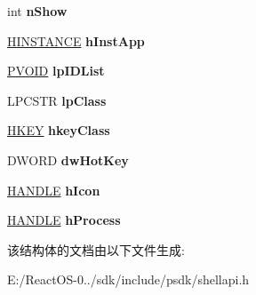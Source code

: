 \begin{DoxyCompactItemize}
\item 
\mbox{\label{struct___s_h_e_l_l_e_x_e_c_u_t_e_i_n_f_o_a_a4584c93c8c4f1a53aa315a49f62ff582}} 
int {\bfseries n\+Show}
\item 
\mbox{\label{struct___s_h_e_l_l_e_x_e_c_u_t_e_i_n_f_o_a_ac3489fd1abdc72976f44166d1aeb1d53}} 
\hyperlink{interfacevoid}{H\+I\+N\+S\+T\+A\+N\+CE} {\bfseries h\+Inst\+App}
\item 
\mbox{\label{struct___s_h_e_l_l_e_x_e_c_u_t_e_i_n_f_o_a_a2f48a7d7e0c1a844d77e313fa35fa6c3}} 
\hyperlink{interfacevoid}{P\+V\+O\+ID} {\bfseries lp\+I\+D\+List}
\item 
\mbox{\label{struct___s_h_e_l_l_e_x_e_c_u_t_e_i_n_f_o_a_a9c24e444699cd4b26fc697a307a43156}} 
L\+P\+C\+S\+TR {\bfseries lp\+Class}
\item 
\mbox{\label{struct___s_h_e_l_l_e_x_e_c_u_t_e_i_n_f_o_a_a7d1bfa5368b63310236b6c4ea32a852f}} 
\hyperlink{interfacevoid}{H\+K\+EY} {\bfseries hkey\+Class}
\item 
\mbox{\label{struct___s_h_e_l_l_e_x_e_c_u_t_e_i_n_f_o_a_a1252bc8cae9469c426a85f468095ecf8}} 
D\+W\+O\+RD {\bfseries dw\+Hot\+Key}
\item 
\mbox{\label{struct___s_h_e_l_l_e_x_e_c_u_t_e_i_n_f_o_a_aa9073cb48fcf3c4f647fbe642a622bee}} 
\hyperlink{interfacevoid}{H\+A\+N\+D\+LE} {\bfseries h\+Icon}
\item 
\mbox{\label{struct___s_h_e_l_l_e_x_e_c_u_t_e_i_n_f_o_a_a43b9194bdf680576b0d3a104e04c4f04}} 
\hyperlink{interfacevoid}{H\+A\+N\+D\+LE} {\bfseries h\+Process}
\end{DoxyCompactItemize}


该结构体的文档由以下文件生成\+:\begin{DoxyCompactItemize}
\item 
E\+:/\+React\+O\+S-\/0../sdk/include/psdk/shellapi.\+h\end{DoxyCompactItemize}
